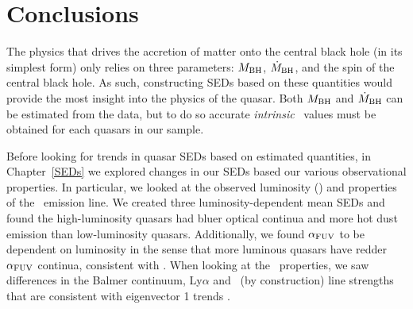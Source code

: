 \chapter{Conclusions} \label{conclusions}



The physics that drives the accretion of matter onto the central black hole (in its simplest form) only relies on three parameters: $M_{\rm BH}$, $\dot{M}_{\rm BH}$, and the spin of the central black hole.  As such, constructing SEDs based on these quantities would provide the most insight into the physics of the quasar.  Both $M_{\rm BH}$ and $\dot{M}_{\rm BH}$ can be estimated from the data, but to do so accurate {\em intrinsic} \lbol\ values must be obtained for each quasars in our sample.   


Before looking for trends in quasar SEDs based on estimated quantities, in Chapter~\ref{SEDs} we explored  changes in our SEDs based our various observational properties.
In particular, we looked at the observed luminosity (\ltwofive) and properties of the \civ\ emission line. 
We created three luminosity-dependent mean SEDs and found the high-luminosity quasars had bluer optical continua and more hot dust emission than low-luminosity quasars. Additionally, we found $\alpha_{{\rm FUV}}$ to be dependent on luminosity in the sense that more luminous quasars have redder $\alpha_{{\rm FUV}}$ continua, consistent with \citet{Scott:2004}. 
When looking at the \civ\ properties, we saw differences in the Balmer continuum, Ly$\alpha$ and \civ\ (by construction) line strengths that are consistent with eigenvector 1 trends \citep{Brotherton:1999}.

